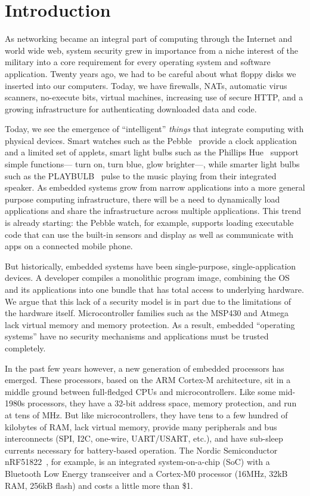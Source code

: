 \section{Introduction}

As networking became an integral part of computing through the Internet and
world wide web, system security grew in importance from a niche interest of the
military into a core requirement for every operating system and software
application. Twenty years ago, we had to be careful about what floppy disks we
inserted into our computers. Today, we have firewalls, NATs, automatic virus
scanners, no-execute bits, virtual machines, increasing use of secure HTTP, and
a growing infrastructure for authenticating downloaded data and code.

Today, we see the emergence of ``intelligent'' \textit{things} that integrate
computing with physical devices. Smart watches such as the Pebble~\cite{pebble}
provide a clock application and a limited set of applets, smart light
bulbs such as the Phillips Hue~\cite{hue} support simple functions---
turn on, turn blue, glow brighter---,
while smarter light bulbs such as the PLAYBULB~\cite{playbulb} pulse to the
music playing from their integrated speaker.  As embedded systems grow from
narrow applications into a more general purpose computing infrastructure,
there will be a need to dynamically load applications and share the
infrastructure across multiple applications.  This trend is already starting:
the Pebble watch, for example, supports loading executable code that can use
the built-in sensors and display as well as communicate with apps on a
connected mobile phone.

But historically, embedded systems have been single-purpose, single-application
devices.  A developer compiles a monolithic program image, combining the OS and
its applications into one bundle that has total access to underlying hardware.
We argue that this lack of a security model is in part due to the limitations of
the hardware itself. Microcontroller families such as the MSP430 and Atmega lack
virtual memory and memory protection.  As a result, embedded ``operating
systems'' have no security mechanisms and applications must be trusted
completely.

In the past few years however, a new generation of embedded processors has
emerged. These processors, based on the ARM Cortex-M architecture, sit in a
middle ground between full-fledged CPUs and microcontrollers. Like some
mid-1980s processors, they have a 32-bit address space, memory protection, and
run at tens of MHz. But like microcontrollers, they have tens to a few hundred
of kilobytes of RAM, lack virtual memory, provide many peripherals and bus
interconnects (SPI, I2C, one-wire, UART/USART, etc.), and have sub-\uA sleep
currents necessary for battery-based operation. The Nordic Semiconductor
nRF51822~\cite{nrf51822}, for example, is an integrated system-on-a-chip (SoC)
with a Bluetooth Low Energy transceiver and a Cortex-M0 processor (16MHz, 32kB
RAM, 256kB flash) and costs a little more than \$1.


